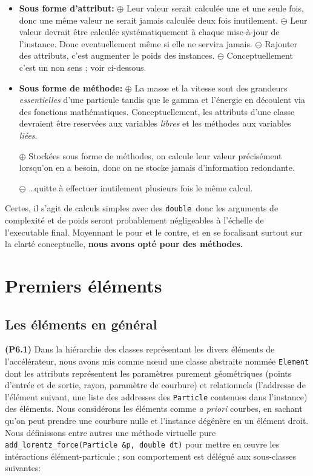 \documentclass[12pt, letterpaper, twoside]{article}
\newcommand{\T}[1]{\texttt{#1}}
\newcommand{\double}{\texttt{double}}
\begin{document}
\begin{itemize}

\item \textbf{Sous forme d'attribut:}
\subitem $\oplus$ Leur valeur serait calculée une et une seule fois, donc une même valeur ne serait jamais calculée deux fois inutilement.
\subitem $\ominus$ Leur valeur devrait être calculée systématiquement à chaque mise-à-jour de l'instance. Donc eventuellement même si elle ne servira jamais.
\subitem $\ominus$ Rajouter des attributs, c'est augmenter le poids des instances.
\subitem $\ominus$ Conceptuellement c'est un non sens ; voir ci-dessous.

\item \textbf{Sous forme de méthode:}
\subitem $\oplus$ La masse et la vitesse sont des grandeurs \textit{essentielles} d'une particule tandis que le gamma et l'énergie en découlent via des fonctions mathématiques. Conceptuellement, les attributs d'une classe devraient être reservées aux variables \textit{libres} et les méthodes aux variables \textit{liées}.

\subitem $\oplus$ Stockées sous forme de méthodes, on calcule leur valeur précisément lorsqu'on en a besoin, donc on ne stocke jamais d'information redondante.

\subitem $\ominus$ \ldots quitte à effectuer inutilement plusieurs fois le même calcul.
\end{itemize}
\bigskip
Certes, il s'agit de calculs simples avec des \double\ donc les arguments de complexité et de poids seront probablement négligeables à l'échelle de l'executable final. Moyennant le pour et le contre, et en se focalisant surtout sur la clarté conceptuelle, \textbf{nous avons opté pour des méthodes.}

\section{Premiers éléments}

\subsection{Les éléments en général}
\noindent \textbf{(P6.1)} Dans la hiérarchie des classes représentant les divers éléments de l'accélérateur, nous avons mis comme nœud une classe abstraite nommée \T{Element} dont les attributs représentent les paramètres purement géométriques (points d'entrée et de sortie, rayon, paramètre de courbure) et relationnels (l'addresse de l'élément suivant, une liste des addresses des \T{Particle} contenues dans l'instance) des éléments. Nous considérons les éléments comme \textit{a priori} courbes, en sachant qu'on peut prendre une courbure nulle et l'instance dégénère en un élément droit. Nous définissons entre autres une méthode virtuelle pure \T{add\_lorentz\_force(Particle \&p, double dt)} pour mettre en œuvre les intéractions élément-particule ; son comportement est délégué aux sous-classes suivantes:
\end{document}
